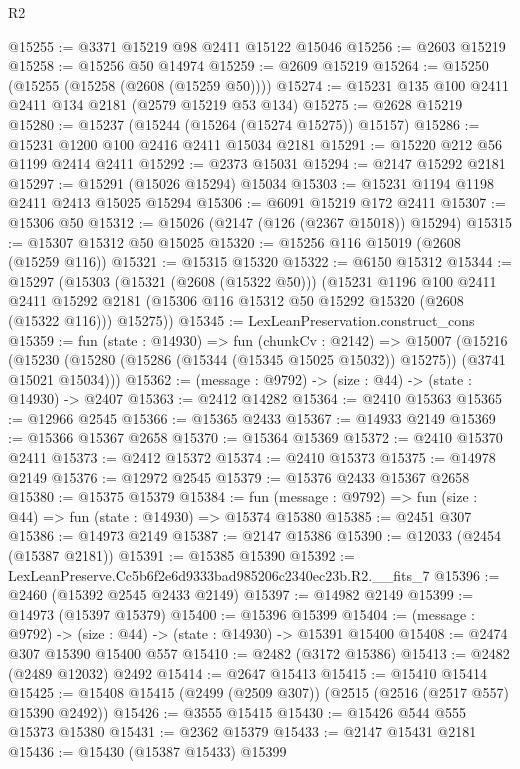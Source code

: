 \begin{lexlean}{R2}
\begin{coremodule}
@15255 := @3371 @15219 @98 @2411 @15122 @15046
@15256 := @2603 @15219
@15258 := @15256 @50 @14974
@15259 := @2609 @15219
@15264 := @15250 (@15255 (@15258 (@2608 (@15259 @50))))
@15274 := @15231 @135 @100 @2411 @2411 @134 @2181 (@2579 @15219 @53 @134)
@15275 := @2628 @15219
@15280 := @15237 (@15244 (@15264 (@15274 @15275)) @15157)
@15286 := @15231 @1200 @100 @2416 @2411 @15034 @2181
@15291 := @15220 @212 @56 @1199 @2414 @2411
@15292 := @2373 @15031
@15294 := @2147 @15292 @2181
@15297 := @15291 (@15026 @15294) @15034
@15303 := @15231 @1194 @1198 @2411 @2413 @15025 @15294
@15306 := @6091 @15219 @172 @2411
@15307 := @15306 @50
@15312 := @15026 (@2147 (@126 (@2367 @15018)) @15294)
@15315 := @15307 @15312 @50 @15025
@15320 := @15256 @116 @15019 (@2608 (@15259 @116))
@15321 := @15315 @15320
@15322 := @6150 @15312
@15344 := @15297
    (@15303
      (@15321 (@2608 (@15322 @50)))
      (@15231
        @1196
        @100
        @2411
        @2411
        @15292
        @2181
        (@15306 @116 @15312 @50 @15292 @15320 (@2608 (@15322 @116)))
        @15275))
@15345 := LexLeanPreservation.construct_cons
@15359 := fun (state : @14930) =>
  fun (chunkCv : @2142) =>
  @15007
    (@15216 (@15230 (@15280 (@15286 (@15344 (@15345 @15025 @15032)) @15275)) (@3741 @15021 @15034)))
@15362 := (message : @9792) -> (size : @44) -> (state : @14930) -> @2407
@15363 := @2412 @14282
@15364 := @2410 @15363
@15365 := @12966 @2545
@15366 := @15365 @2433
@15367 := @14933 @2149
@15369 := @15366 @15367 @2658
@15370 := @15364 @15369
@15372 := @2410 @15370 @2411
@15373 := @2412 @15372
@15374 := @2410 @15373
@15375 := @14978 @2149
@15376 := @12972 @2545
@15379 := @15376 @2433 @15367 @2658
@15380 := @15375 @15379
@15384 := fun (message : @9792) => fun (size : @44) => fun (state : @14930) => @15374 @15380
@15385 := @2451 @307
@15386 := @14973 @2149
@15387 := @2147 @15386
@15390 := @12033 (@2454 (@15387 @2181))
@15391 := @15385 @15390
@15392 := LexLeanPreserve.Cc5b6f2e6d9333bad985206c2340ec23b.R2.__fits_7
@15396 := @2460 (@15392 @2545 @2433 @2149)
@15397 := @14982 @2149
@15399 := @14973 (@15397 @15379)
@15400 := @15396 @15399
@15404 := (message : @9792) -> (size : @44) -> (state : @14930) -> @15391 @15400
@15408 := @2474 @307 @15390 @15400 @557
@15410 := @2482 (@3172 @15386)
@15413 := @2482 (@2489 @12032) @2492
@15414 := @2647 @15413
@15415 := @15410 @15414
@15425 := @15408 @15415 (@2499 (@2509 @307)) (@2515 (@2516 (@2517 @557) @15390 @2492))
@15426 := @3555 @15415
@15430 := @15426 @544 @555 @15373 @15380
@15431 := @2362 @15379
@15433 := @2147 @15431 @2181
@15436 := @15430 (@15387 @15433) @15399

\end{coremodule}
\end{lexlean}

